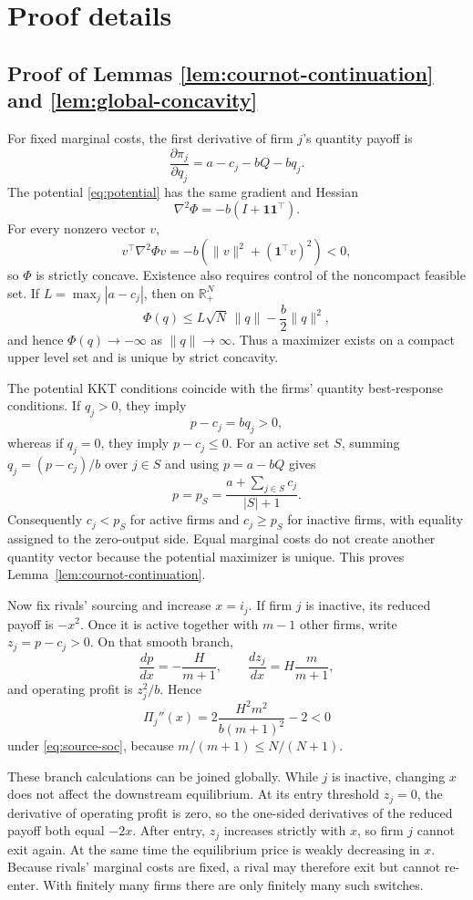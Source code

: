 \appendix

\section{Proof details}
\label{app:proofs}

\subsection{Proof of Lemmas \ref{lem:cournot-continuation} and \ref{lem:global-concavity}}

For fixed marginal costs, the first derivative of firm \(j\)'s quantity payoff is
\[
\frac{\partial\pi_j}{\partial q_j}
=
a-c_j-bQ-bq_j.
\]
The potential \eqref{eq:potential} has the same gradient and Hessian
\[
\nabla^2\Phi=-b(I+\mathbf 1\mathbf 1^\top).
\]
For every nonzero vector \(v\),
\[
v^\top\nabla^2\Phi v
=
-b\left(\lVert v\rVert^2+(\mathbf 1^\top v)^2\right)<0,
\]
so \(\Phi\) is strictly concave.  Existence also requires control of the
noncompact feasible set.  If
\(L=\max_j|a-c_j|\), then on \(\mathbb R_+^N\)
\[
\Phi(q)
\le
L\sqrt N\,\lVert q\rVert
-\frac b2\lVert q\rVert^2,
\]
and hence \(\Phi(q)\to-\infty\) as \(\lVert q\rVert\to\infty\).
Thus a maximizer exists on a compact upper level set and is unique by strict
concavity.

The potential KKT conditions coincide with the firms' quantity best-response
conditions.  If \(q_j>0\), they imply
\[
p-c_j=bq_j>0,
\]
whereas if \(q_j=0\), they imply \(p-c_j\le0\).  For an active set
\(S\), summing \(q_j=(p-c_j)/b\) over \(j\in S\) and using
\(p=a-bQ\) gives
\[
p=p_S=\frac{a+\sum_{j\in S}c_j}{|S|+1}.
\]
Consequently \(c_j<p_S\) for active firms and \(c_j\ge p_S\) for inactive
firms, with equality assigned to the zero-output side.  Equal marginal costs do
not create another quantity vector because the potential maximizer is unique.
This proves Lemma~\ref{lem:cournot-continuation}.

Now fix rivals' sourcing and increase \(x=i_j\).  If firm \(j\) is inactive,
its reduced payoff is \(-x^2\).  Once it is active together with \(m-1\)
other firms, write \(z_j=p-c_j>0\).  On that smooth branch,
\[
\frac{dp}{dx}=-\frac{H}{m+1},
\qquad
\frac{dz_j}{dx}=H\frac{m}{m+1},
\]
and operating profit is \(z_j^2/b\).  Hence
\[
\Pi_j''(x)
=
2\frac{H^2m^2}{b(m+1)^2}-2<0
\]
under \eqref{eq:source-soc}, because \(m/(m+1)\le N/(N+1)\).

These branch calculations can be joined globally.  While \(j\) is inactive,
changing \(x\) does not affect the downstream equilibrium.  At its entry
threshold \(z_j=0\), the derivative of operating profit is zero, so the
one-sided derivatives of the reduced payoff both equal \(-2x\).  After entry,
\(z_j\) increases strictly with \(x\), so firm \(j\) cannot exit again.
At the same time the equilibrium price is weakly decreasing in \(x\).
Because rivals' marginal costs are fixed, a rival may therefore exit but cannot
re-enter.  With finitely many firms there are only finitely many such switches.

